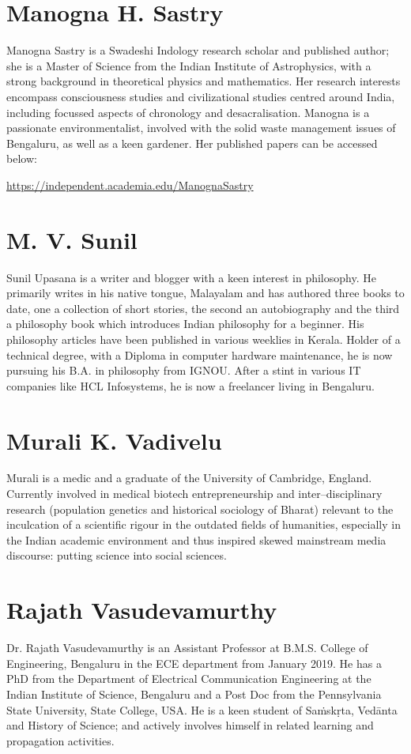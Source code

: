 \section*{Manogna H. Sastry}

Manogna Sastry is a Swadeshi Indology research scholar and published author; she is a Master of Science from the Indian Institute of Astrophysics, with a strong background in theoretical physics and mathematics. Her research interests encompass consciousness studies and civilizational studies centred around India, including focussed aspects of chronology and desacralisation. Manogna is a passionate environmentalist, involved with the solid waste management issues of Bengaluru, as well as a keen gardener. Her published papers can be accessed below:

\url{https://independent.academia.edu/ManognaSastry}


\section*{M. V. Sunil}

Sunil Upasana is a writer and blogger with a keen interest in philosophy. He primarily writes in his native tongue, Malayalam and has authored three books to date, one a collection of short stories, the second an autobiography and the third a philosophy book which introduces Indian philosophy for a beginner. His philosophy articles have been published in various weeklies in Kerala. Holder of a technical degree, with a Diploma in computer hardware maintenance, he is now pursuing his B.A. in philosophy from IGNOU. After a stint in various IT companies like HCL Infosystems, he is now a freelancer living in Bengaluru.


\section*{Murali K. Vadivelu}

Murali is a medic and a graduate of the University of Cambridge, England. Currently involved in medical biotech entrepreneurship and inter–disciplinary research (population genetics and historical sociology of Bharat) relevant to the inculcation of a scientific rigour in the outdated fields of humanities, especially in the Indian academic environment and thus inspired skewed mainstream media discourse: putting science into social sciences.


\section*{Rajath Vasudevamurthy}

Dr. Rajath Vasudevamurthy is an Assistant Professor at B.M.S. College of Engineering, Bengaluru in the ECE department from January 2019. He has a PhD from the Department of Electrical Communication Engineering at the Indian Institute of Science, Bengaluru and a Post Doc from the Pennsylvania State University, State College, USA. He is a keen student of Saṁskṛta, Vedānta and History of Science; and actively involves himself in related learning and propagation activities.

